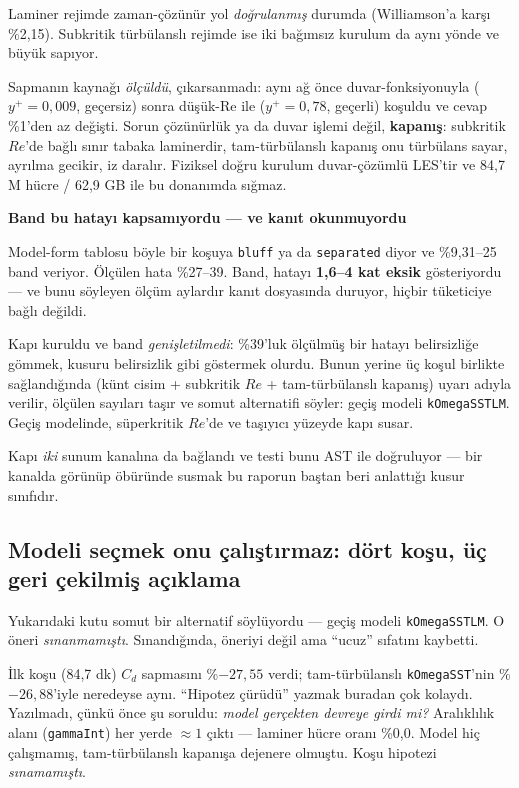 \documentclass[11pt,a4paper]{article}
\newcommand{\kkkenar}{lacivert}
\newcommand{\kkzemin}{kod}
\newenvironment{renkkutu}[3]{%
  \renewcommand{\kkkenar}{#1}\renewcommand{\kkzemin}{#2}%
  \par\medskip\noindent
  \begin{lrbox}{\kutugovde}%
  \begin{minipage}{\dimexpr\linewidth-2\fboxsep-2\fboxrule\relax}\footnotesize
  \textcolor{#1}{\textbf{#3}}\par\vspace{3pt}%
}{%
  \end{minipage}%
  \end{lrbox}%
  \noindent\fcolorbox{\kkkenar}{\kkzemin}{\usebox{\kutugovde}}%
  \par\medskip
}
\newenvironment{dikkat}[1]{\begin{renkkutu}{orta}{ortabg}{#1}}{\end{renkkutu}}
\begin{document}
\noindent Laminer rejimde zaman-çözünür yol \emph{doğrulanmış} durumda
(Williamson'a karşı \%2{,}15). Subkritik türbülanslı rejimde ise iki bağımsız
kurulum da aynı yönde ve büyük sapıyor.

Sapmanın kaynağı \emph{ölçüldü}, çıkarsanmadı: aynı ağ önce duvar-fonksiyonuyla
($y^+ = 0{,}009$, geçersiz) sonra düşük-Re ile ($y^+ = 0{,}78$, geçerli)
koşuldu ve cevap \%1'den az değişti. Sorun çözünürlük ya da duvar işlemi değil,
\textbf{kapanış}: subkritik $Re$'de bağlı sınır tabaka laminerdir,
tam-türbülanslı kapanış onu türbülans sayar, ayrılma gecikir, iz daralır.
Fiziksel doğru kurulum duvar-çözümlü LES'tir ve 84{,}7 M hücre / 62{,}9 GB ile
bu donanımda sığmaz.

\begin{dikkat}{Band bu hatayı kapsamıyordu --- ve kanıt okunmuyordu}
Model-form tablosu böyle bir koşuya \texttt{bluff} ya da \texttt{separated}
diyor ve \%9{,}31--25 band veriyor. Ölçülen hata \%27--39. Band, hatayı
\textbf{1{,}6--4 kat eksik} gösteriyordu --- ve bunu söyleyen ölçüm aylardır
kanıt dosyasında duruyor, hiçbir tüketiciye bağlı değildi.

Kapı kuruldu ve band \emph{genişletilmedi}: \%39'luk ölçülmüş bir hatayı
belirsizliğe gömmek, kusuru belirsizlik gibi göstermek olurdu. Bunun yerine
üç koşul birlikte sağlandığında (künt cisim + subkritik $Re$ +
tam-türbülanslı kapanış) uyarı adıyla verilir, ölçülen sayıları taşır ve
somut alternatifi söyler: geçiş modeli \texttt{kOmegaSSTLM}. Geçiş
modelinde, süperkritik $Re$'de ve taşıyıcı yüzeyde kapı susar.

Kapı \emph{iki} sunum kanalına da bağlandı ve testi bunu AST ile doğruluyor
--- bir kanalda görünüp öbüründe susmak bu raporun baştan beri anlattığı
kusur sınıfıdır.
\end{dikkat}

\subsection{Modeli seçmek onu çalıştırmaz: dört koşu, üç geri çekilmiş açıklama}
\label{sub:gecis}

Yukarıdaki kutu somut bir alternatif söylüyordu --- geçiş modeli
\texttt{kOmegaSSTLM}. O öneri \emph{sınanmamıştı}. Sınandığında, öneriyi
değil ama ``ucuz'' sıfatını kaybetti.

İlk koşu (84,7 dk) $C_d$ sapmasını \%$-27{,}55$ verdi; tam-türbülanslı
\texttt{kOmegaSST}'nin \%$-26{,}88$'iyle neredeyse aynı. ``Hipotez çürüdü''
yazmak buradan çok kolaydı. Yazılmadı, çünkü önce şu soruldu: \emph{model
gerçekten devreye girdi mi?} Aralıklılık alanı (\texttt{gammaInt}) her yerde
$\approx 1$ çıktı --- laminer hücre oranı \%0{,}0. Model hiç çalışmamış,
tam-türbülanslı kapanışa dejenere olmuştu. Koşu hipotezi \emph{sınamamıştı}.
\end{document}
